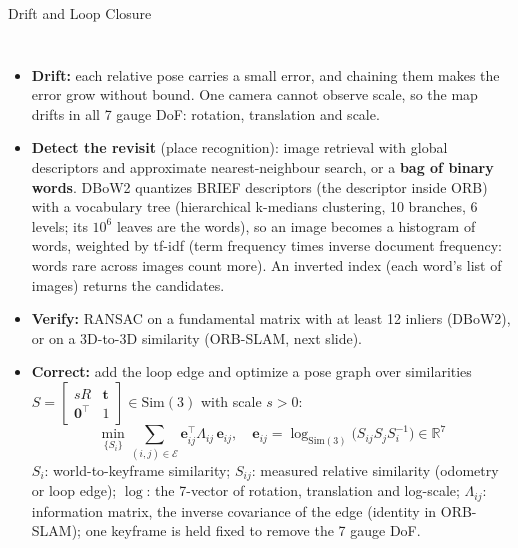 \begin{frame}{Drift and Loop Closure}
  \begin{columns}[T,onlytextwidth]
      \begin{itemize}\scriptsize\itemsep0.15em
        \item \textbf{Drift:} each relative pose carries a small error, and chaining them makes the error grow without bound. One camera cannot observe scale, so the map drifts in all 7 gauge DoF: rotation, translation and scale.
        \item \textbf{Detect the revisit} (place recognition): image retrieval with global descriptors and approximate nearest-neighbour search, or a \textbf{bag of binary words}. DBoW2 quantizes BRIEF descriptors (the descriptor inside ORB) with a vocabulary tree (hierarchical k-medians clustering, 10 branches, 6 levels; its $10^6$ leaves are the words), so an image becomes a histogram of words, weighted by tf-idf (term frequency times inverse document frequency: words rare across images count more). An inverted index (each word's list of images) returns the candidates.
        \item \textbf{Verify:} RANSAC on a fundamental matrix with at least 12 inliers (DBoW2), or on a 3D-to-3D similarity (ORB-SLAM, next slide).
        \item \textbf{Correct:} add the loop edge and optimize a pose graph over similarities $S=\left[\begin{smallmatrix} sR & \mathbf{t}\\ \mathbf{0}^\top & 1\end{smallmatrix}\right]\in\mathrm{Sim}(3)$ with scale $s>0$:
        \[ \min_{\{S_i\}} \sum_{(i,j)\in\mathcal{E}} \mathbf{e}_{ij}^\top \Lambda_{ij}\,\mathbf{e}_{ij},\quad \mathbf{e}_{ij}=\log_{\mathrm{Sim}(3)}\!\big(S_{ij}S_jS_i^{-1}\big)\in\mathbb{R}^7 \]
        $S_i$: world-to-keyframe similarity; $S_{ij}$: measured relative similarity (odometry or loop edge); $\log$: the 7-vector of rotation, translation and log-scale; $\Lambda_{ij}$: information matrix, the inverse covariance of the edge (identity in ORB-SLAM); one keyframe is held fixed to remove the 7 gauge DoF.
      \end{itemize}
      \centering
\end{columns}
\end{frame}

